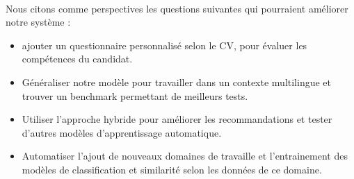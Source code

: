 \documentclass{article}
\begin{document}
\paragraph{}Nous citons comme perspectives les questions suivantes qui pourraient améliorer notre système :
\begin{itemize}
	\item ajouter un questionnaire personnalisé selon le CV, pour évaluer les compétences du candidat.
	\item Généraliser notre modèle pour travailler dans un contexte multilingue et trouver un benchmark  permettant de meilleurs tests.
	
	\item Utiliser l'approche hybride pour améliorer les recommandations et tester d'autres modèles d'apprentissage automatique.
	
	\item Automatiser l'ajout de nouveaux domaines de travaille et l'entrainement des modèles de classification et similarité selon les données de ce domaine.
\end{itemize}
\end{document}
